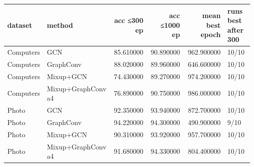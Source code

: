 \begin{tabular}{llrrrl}
\toprule
dataset & method & acc ≤300 ep & acc ≤1000 ep & mean best epoch & runs best after 300 \\
\midrule
Computers & GCN & 85.610000 & 90.890000 & 962.900000 & 10/10 \\
Computers & GraphConv & 88.020000 & 89.960000 & 646.600000 & 10/10 \\
Computers & Mixup+GCN & 74.430000 & 89.270000 & 974.200000 & 10/10 \\
Computers & Mixup+GraphConv a4 & 76.890000 & 90.750000 & 986.000000 & 10/10 \\
Photo & GCN & 92.350000 & 93.940000 & 872.700000 & 10/10 \\
Photo & GraphConv & 94.220000 & 94.300000 & 490.900000 & 9/10 \\
Photo & Mixup+GCN & 90.310000 & 93.920000 & 957.700000 & 10/10 \\
Photo & Mixup+GraphConv a4 & 91.680000 & 94.330000 & 804.400000 & 10/10 \\
\bottomrule
\end{tabular}
